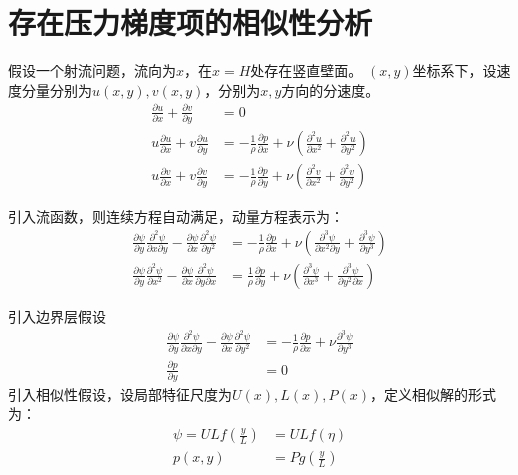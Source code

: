 \section{存在压力梯度项的相似性分析}
假设一个射流问题，流向为$x$，在$x=H$处存在竖直壁面。
$(x,y)$坐标系下，设速度分量分别为$u(x,y),v(x,y)$，分别为$x,y$方向的分速度。
\begin{align}
    \frac{\partial u}{\partial x}+\frac{\partial v}{\partial y}&=0\\
    u\frac{\partial u}{\partial x}+v\frac{\partial u}{\partial y}&=-\frac{1}{\rho}\frac{\partial p}{\partial x}+\nu\left(\frac{\partial^{2} u}{\partial x^{2}}+\frac{\partial^{2} u}{\partial y^{2}}\right)\\
    u\frac{\partial v}{\partial x}+v\frac{\partial v}{\partial y}&=-\frac{1}{\rho}\frac{\partial p}{\partial y}+\nu\left(\frac{\partial^{2} v}{\partial x^{2}}+\frac{\partial^{2} v}{\partial y^{2}}\right)
\end{align}

引入流函数，则连续方程自动满足，动量方程表示为：
\begin{align}
    \frac{\partial \psi}{\partial y}\frac{\partial^{2} \psi}{\partial x\partial y}-\frac{\partial \psi}{\partial x}\frac{\partial^{2} \psi}{\partial y^{2}}&=-\frac{1}{\rho}\frac{\partial p}{\partial x}+\nu(\frac{\partial^{3} \psi}{\partial x^{2}\partial y}+\frac{\partial^{3} \psi}{\partial y^{3}})\\
    \frac{\partial \psi}{\partial y}\frac{\partial^{2} \psi}{\partial x^{2}}-\frac{\partial \psi}{\partial x}\frac{\partial^{2} \psi}{\partial y\partial x}&=\frac{1}{\rho}\frac{\partial p}{\partial y}+\nu(\frac{\partial^{3} \psi}{\partial x^{3}}+\frac{\partial^{3} \psi}{\partial y^{2}\partial x})
\end{align}

引入边界层假设
\begin{align}
    \frac{\partial \psi}{\partial y}\frac{\partial^{2} \psi}{\partial x\partial y} - \frac{\partial \psi}{\partial x}\frac{\partial^{2} \psi}{\partial y^{2}}&=-\frac{1}{\rho}\frac{\partial p}{\partial x}+\nu\frac{\partial^{3} \psi}{\partial y^{3}}\\
    \frac{\partial p}{\partial y}&=0
\end{align}
引入相似性假设，设局部特征尺度为$U(x),L(x),P(x)$，定义相似解的形式为：
\begin{align}
    \psi=ULf(\frac{y}{L})&=ULf(\eta)\\
    p(x,y)&=Pg(\frac{y}{L})
\end{align}

